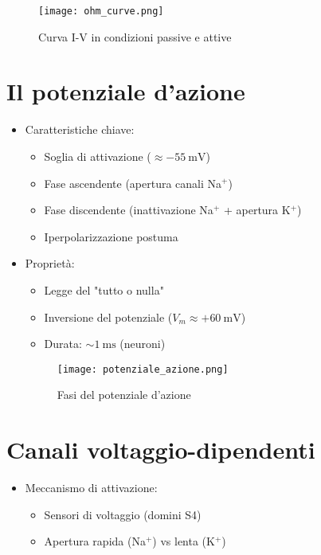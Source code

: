 \documentclass{article}
\begin{document}
\begin{itemize}
\begin{itemize}
\begin{figure}[h]
\centering
\texttt{[image: ohm\_curve.png]}
\caption{Curva I-V in condizioni passive e attive}
\label{fig:ohm}
\end{figure}
\end{itemize}

\section{Il potenziale d'azione}
\begin{itemize}
\item Caratteristiche chiave:
  \begin{itemize}
  \item Soglia di attivazione (\(\approx \SI{-55}{\milli\volt}\))
  \item Fase ascendente (apertura canali Na\(^+\))
  \item Fase discendente (inattivazione Na\(^+\) + apertura K\(^+\))
  \item Iperpolarizzazione postuma
  \end{itemize}

\item Proprietà:
  \begin{itemize}
  \item Legge del "tutto o nulla"
  \item Inversione del potenziale (\(V_m \approx +\SI{60}{\milli\volt}\))
  \item Durata: \(\sim\SI{1}{\milli\second}\) (neuroni)
  \end{itemize}

\begin{figure}[h]
\centering
\texttt{[image: potenziale\_azione.png]}
\caption{Fasi del potenziale d'azione}
\label{fig:azione}
\end{figure}
\end{itemize}

\section{Canali voltaggio-dipendenti}
\begin{itemize}
\item Meccanismo di attivazione:
  \begin{itemize}
  \item Sensori di voltaggio (domini S4)
  \item Apertura rapida (Na\(^+\)) vs lenta (K\(^+\))
  \end{itemize}


\end{itemize}
\end{itemize}
\end{document}
